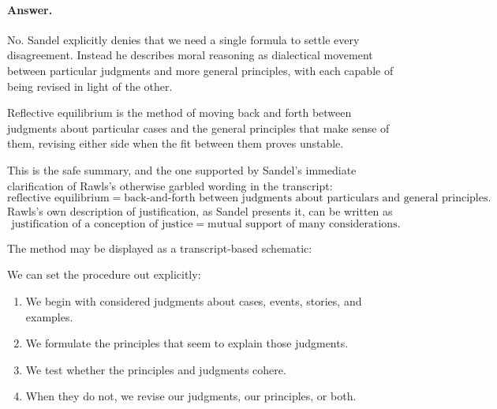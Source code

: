 \paragraph{Answer.} No. Sandel explicitly denies that we need a single formula to settle every disagreement. Instead he describes moral reasoning as dialectical movement between particular judgments and more general principles, with each capable of being revised in light of the other.

\begin{definition}
Reflective equilibrium is the method of moving back and forth between judgments about particular cases and the general principles that make sense of them, revising either side when the fit between them proves unstable.
\end{definition}

This is the safe summary, and the one supported by Sandel's immediate clarification of Rawls's otherwise garbled wording in the transcript:
\begin{equation}
\text{reflective equilibrium}
=
\text{back-and-forth between judgments about particulars and general principles}.
\end{equation}
Rawls's own description of justification, as Sandel presents it, can be written as
\begin{equation}
\text{justification of a conception of justice}
=
\text{mutual support of many considerations}.
\end{equation}

The method may be displayed as a transcript-based schematic:

\begin{figure}[h]
\centering
{}
\end{figure}

We can set the procedure out explicitly:
\begin{enumerate}
\item We begin with considered judgments about cases, events, stories, and examples.
\item We formulate the principles that seem to explain those judgments.
\item We test whether the principles and judgments cohere.
\item When they do not, we revise our judgments, our principles, or both.
\end{enumerate}

